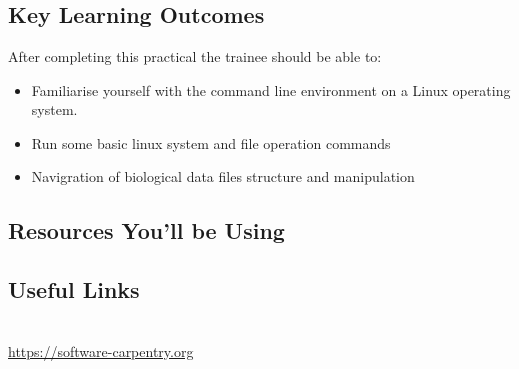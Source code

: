 




\chapter{\moduleTitle}
\newpage

\section{Key Learning Outcomes}

After completing this practical the trainee should be able to:
\begin{itemize}
  \item Familiarise yourself with the command line environment on a Linux operating system.
  \item Run some basic linux system and file operation commands
  \item Navigration of biological data files structure and manipulation
\end{itemize}

\section{Resources You'll be Using}
 

\section{Useful Links}
 
\begin{description}[style=multiline,labelindent=0cm,align=left,leftmargin=0.5cm]
  \item [Software Carpentry]\hfill\\
    \url{https://software-carpentry.org}
\end{description}


